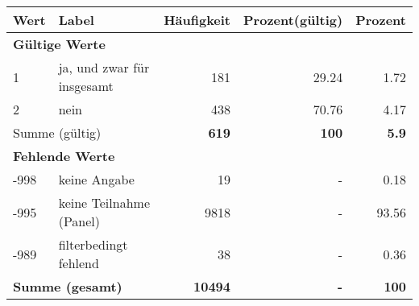      \begin{longtable}{lXrrr}
     \toprule
     \textbf{Wert} & \textbf{Label} & \textbf{Häufigkeit} & \textbf{Prozent(gültig)} & \textbf{Prozent} \\
     \endhead
     \midrule
     \multicolumn{5}{l}{\textbf{Gültige Werte}}\\

     1 &
     \multicolumn{1}{X}{ ja, und zwar für insgesamt   } &


       \num{181} &
       \num[round-mode=places,round-precision=2]{29,24} &
         \num[round-mode=places,round-precision=2]{1,72} \\

     2 &
     \multicolumn{1}{X}{ nein   } &


       \num{438} &
       \num[round-mode=places,round-precision=2]{70,76} &
         \num[round-mode=places,round-precision=2]{4,17} \\
     \midrule
     \multicolumn{2}{l}{Summe (gültig)} &
       \textbf{\num{619}} &
     \textbf{100} &
       \textbf{\num[round-mode=places,round-precision=2]{5,9}} \\
     \multicolumn{5}{l}{\textbf{Fehlende Werte}}\\
       -998 &
       keine Angabe &
         \num{19} &
        - &
         \num[round-mode=places,round-precision=2]{0,18} \\
       -995 &
       keine Teilnahme (Panel) &
         \num{9818} &
        - &
         \num[round-mode=places,round-precision=2]{93,56} \\
       -989 &
       filterbedingt fehlend &
         \num{38} &
        - &
         \num[round-mode=places,round-precision=2]{0,36} \\
     \midrule
     \multicolumn{2}{l}{\textbf{Summe (gesamt)}} &
          \textbf{\num{10494}} &
        \textbf{-} &
        \textbf{100} \\
     \bottomrule
     \end{longtable}
     
